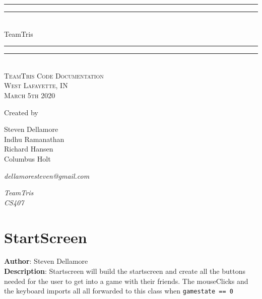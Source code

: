 \documentclass[12pt]{article}
\newlength{\drop}
\begin{document}
  \begin{titlepage}
    \centering
    \textheight
    \vspace*{7\baselineskip}
    \rule{\textwidth}{1.6pt}\vspace*{-\baselineskip}\vspace*{2pt}
    \rule{\textwidth}{0.4pt}\\[\baselineskip]
    {\LARGE TeamTris}\\[0.2\baselineskip]
    \rule{\textwidth}{0.4pt}\vspace*{-\baselineskip}\vspace{3.2pt}
    \rule{\textwidth}{1.6pt}\\[\baselineskip]
    \scshape
    TeamTris Code Documentation \\
    West Lafayette, IN \\
    March 5th 2020\par
    \vspace*{2\baselineskip}
    Created by \\[\baselineskip]
    {\Large Steven Dellamore \\ Indhu Ramanathan \\ Richard Hansen \\ Columbus Holt\par}
    {\itshape dellamoresteven@gmail.com\par}
    {\itshape TeamTris \\ CS407\par}
  \end{titlepage}
  
\tableofcontents
\newpage


\section{StartScreen}
\textbf{Author}: Steven Dellamore \\
\textbf{Description}: Startscreen will build the startscreen and create all the buttons needed for the user to get into a game with their friends. The mouseClicks and the keyboard imports all all forwarded to this class when \texttt{gamestate == 0} \\
\end{document}
